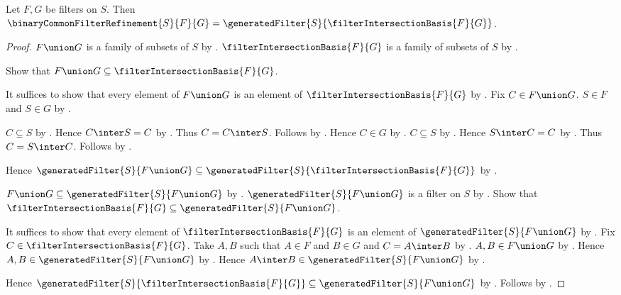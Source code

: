 \begin{theorem}\label{binary_common_filter_refinement_eq_intersection_basis}
    Let $F,G$ be filters on $S$.
    Then $\binaryCommonFilterRefinement{S}{F}{G}
        =\generatedFilter{S}{\filterIntersectionBasis{F}{G}}$.
\end{theorem}
\begin{proof}
    $F\union G$ is a family of subsets of $S$ by
        .
    $\filterIntersectionBasis{F}{G}$ is a family of subsets of $S$ by
        .

    Show that $F\union G\subseteq\filterIntersectionBasis{F}{G}$.
    \begin{subproof}
        It suffices to show that every element of $F\union G$ is an element
            of $\filterIntersectionBasis{F}{G}$ by .
        Fix $C\in F\union G$.
        $S\in F$ and $S\in G$ by .
        \begin{byCase}
            $C\subseteq S$ by .
            Hence $C\inter S=C$ by .
            Thus $C=C\inter S$.
            Follows by .
            Hence $C\in G$ by .
            $C\subseteq S$ by .
            Hence $S\inter C=C$ by .
            Thus $C=S\inter C$.
            Follows by .
        \end{byCase}
    \end{subproof}
    Hence $\generatedFilter{S}{F\union G}\subseteq
        \generatedFilter{S}{\filterIntersectionBasis{F}{G}}$ by
        .

    $F\union G\subseteq\generatedFilter{S}{F\union G}$ by
        .
    $\generatedFilter{S}{F\union G}$ is a filter on $S$ by
        .
    Show that $\filterIntersectionBasis{F}{G}
        \subseteq\generatedFilter{S}{F\union G}$.
    \begin{subproof}
        It suffices to show that every element of
            $\filterIntersectionBasis{F}{G}$ is an element of
            $\generatedFilter{S}{F\union G}$ by .
        Fix $C\in\filterIntersectionBasis{F}{G}$.
        Take $A,B$ such that $A\in F$ and $B\in G$ and $C=A\inter B$ by
            .
        $A,B\in F\union G$ by .
        Hence $A,B\in\generatedFilter{S}{F\union G}$ by .
        Hence $A\inter B\in\generatedFilter{S}{F\union G}$ by
            .
    \end{subproof}
    Hence $\generatedFilter{S}{\filterIntersectionBasis{F}{G}}
        \subseteq\generatedFilter{S}{F\union G}$ by
        .
    Follows by
        .
\end{proof}

